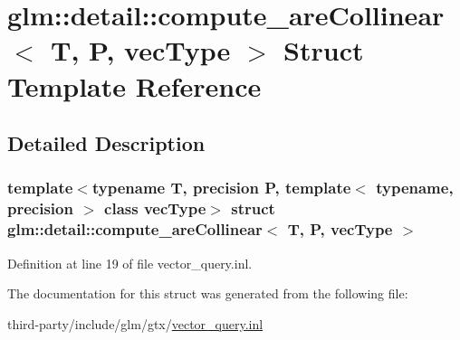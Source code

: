 \hypertarget{structglm_1_1detail_1_1compute__are_collinear}{}\section{glm\+:\+:detail\+:\+:compute\+\_\+are\+Collinear$<$ T, P, vec\+Type $>$ Struct Template Reference}
\label{structglm_1_1detail_1_1compute__are_collinear}


\subsection{Detailed Description}
\subsubsection*{template$<$typename T, precision P, template$<$ typename, precision $>$ class vec\+Type$>$\newline
struct glm\+::detail\+::compute\+\_\+are\+Collinear$<$ T, P, vec\+Type $>$}



Definition at line 19 of file vector\+\_\+query.\+inl.



The documentation for this struct was generated from the following file\+:\begin{DoxyCompactItemize}
\item 
third-\/party/include/glm/gtx/\hyperlink{vector__query_8inl}{vector\+\_\+query.\+inl}\end{DoxyCompactItemize}
